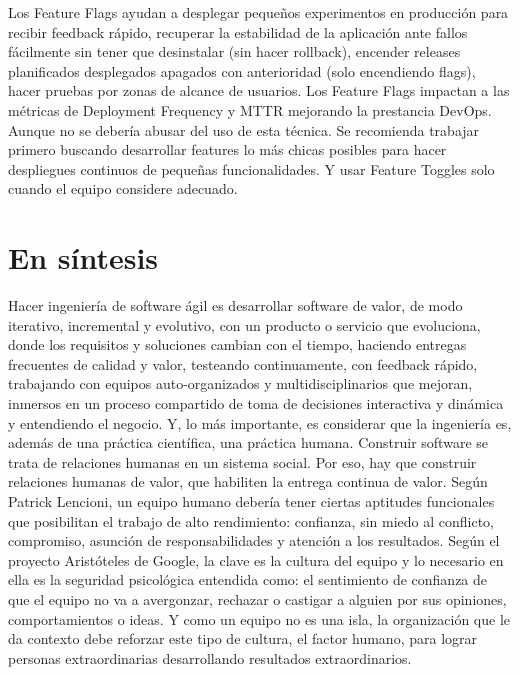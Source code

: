 Los Feature Flags ayudan a desplegar pequeños experimentos en producción para recibir feedback rápido, recuperar la estabilidad de la aplicación ante fallos fácilmente sin tener que desinstalar (sin hacer rollback), encender releases planificados desplegados apagados con anterioridad (solo encendiendo flags), hacer pruebas por zonas de alcance de usuarios. Los Feature Flags impactan a las métricas de Deployment Frequency y MTTR mejorando la prestancia DevOps. Aunque no se debería abusar del uso de esta técnica. Se recomienda trabajar primero buscando desarrollar features lo más chicas posibles para hacer despliegues continuos de pequeñas funcionalidades. Y usar Feature Toggles solo cuando el equipo considere adecuado.

\section{En síntesis}

Hacer ingeniería de software ágil es desarrollar software de valor, de modo iterativo, incremental y evolutivo, con un producto o servicio que evoluciona, donde los requisitos y soluciones cambian con el tiempo, haciendo entregas frecuentes de calidad y valor, testeando continuamente, con feedback rápido, trabajando con equipos auto-organizados y multidisciplinarios que mejoran, inmersos en un proceso compartido de toma de decisiones interactiva y dinámica y entendiendo el negocio. Y, lo más importante, es considerar que la ingeniería es, además de una práctica científica, una práctica humana. Construir software se trata de relaciones humanas en un sistema social. Por eso, hay que construir relaciones humanas de valor, que habiliten la entrega continua de valor. Según Patrick Lencioni, un equipo humano debería tener ciertas aptitudes funcionales que posibilitan el trabajo de alto rendimiento: confianza, sin miedo al conflicto, compromiso, asunción de responsabilidades y atención a los resultados. Según el proyecto Aristóteles de Google, la clave es la cultura del equipo y lo necesario en ella es la seguridad psicológica entendida como: el sentimiento de confianza de que el equipo no va a avergonzar, rechazar o castigar a alguien por sus opiniones, comportamientos o ideas. Y como un equipo no es una isla, la organización que le da contexto debe reforzar este tipo de cultura, el factor humano, para lograr personas extraordinarias desarrollando resultados extraordinarios.
